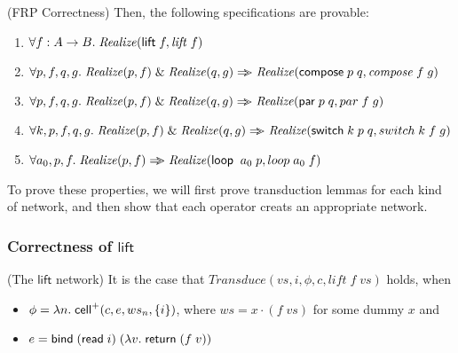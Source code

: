 \begin{prop}{(FRP Correctness)}
Then, the following specifications are provable: 
\begin{enumerate}
\item $\forall f:A\to B.\; \mathit{Realize}(\mathsf{lift}\; f, \mathit{lift}\;f)$
\item $\forall p, f, q, g.\;\mathit{Realize}(p, f) \;\&\; \mathit{Realize}(q, g) \Rightarrow\!\!\!> \mathit{Realize}(\mathsf{compose}\; p\;q, \mathit{compose}\;f\;g)$
\item $\forall p, f, q, g.\;\mathit{Realize}(p, f) \;\&\; \mathit{Realize}(q, g)
                       \Rightarrow\!\!\!> \mathit{Realize}(\mathsf{par}\; p\;q, par\;f\;g)$
\item $\forall k, p, f, q, g.\;\mathit{Realize}(p, f) \;\&\; \mathit{Realize}(q, g)
                          \Rightarrow\!\!\!> \mathit{Realize}(\mathsf{switch}\; k\;p\;q, switch\;k\;f\;g)$
\item $\forall a_0, p, f.\; \mathit{Realize}(p, f) \Rightarrow\!\!\!> \mathit{Realize}(\mathsf{loop}\;\;a_0\;p, loop\;a_0\;f)$
\end{enumerate}

\end{prop}

\noindent To prove these properties, we will first prove transduction lemmas for each kind of 
network, and then show that each operator creats an appropriate network. 

\subsubsection{Correctness of $\mathsf{lift}$}

\begin{lemma}{(The $\mathsf{lift}$ network)}
It is the case that $\mathit{Transduce}(vs, i, \phi, c, \mathit{lift}\;f\;vs)$ holds, when
\begin{itemize}
\item $\phi = \lambda n.\;\mathsf{cell}^{+}({c}, {e}, {ws_n}, {\{{i}\}})$, where $ws = x \cdot (f\;vs)$ for some dummy $x$ and
\item $e = \mathsf{bind}\; (\mathsf{read}\; i)\; (\lambda v.\;\mathsf{return}\; (f\;v))$
\end{itemize}
\end{lemma}

